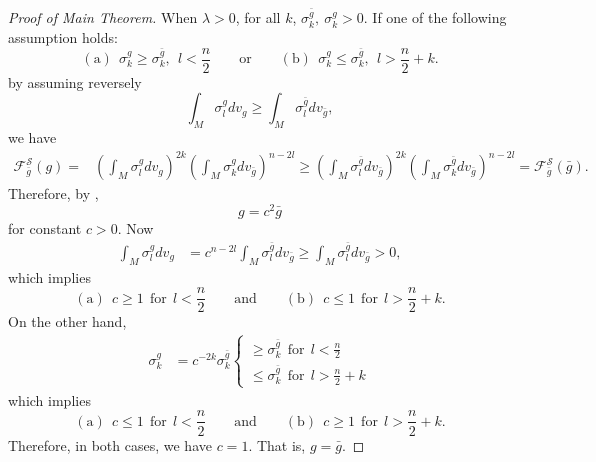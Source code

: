 \documentclass[12pt]{amsart}
\newcommand{\bg}{\bar{g}}
\numberwithin{equation}{section}
\begin{document}
\begin{proof}[Proof of Main Theorem]
    When $\lambda>0$, for all $k$, $\sigma_k^{\bg},\ \sigma_k^g>0$. If one of the following assumption holds:
    \begin{equation*}
        \mathrm{(a)}\ \ \sigma_k^g \geq \sigma_k^{\bg}, \ \ l< \frac{n}{2}\qquad\mathrm{or}\qquad\mathrm{(b)}\ \  \sigma_k^g \leq \sigma_k^{\bg}, \ \ l > \frac{n}{2} + k.
    \end{equation*}
    by assuming reversely
    \begin{equation*}
        \int_M\sigma_l^gdv_g\geq\int_M\sigma_l^{\bg}dv_{\bg},
    \end{equation*}
    we have
    \begin{align*}
        \mathcal{F}_{\bg}^{\mathcal{S}}(g)=&\left(\int_M\sigma_l^gdv_g\right)^{2k}\left(\int_M\sigma_k^gdv_{\bg}\right)^{n-2l} \geq \left( \int_M\sigma_l^{\bg}dv_{\bg} \right)^{2k} \left(\int_M\sigma_k^{\bg}dv_{\bg}\right)^{n-2l}=\mathcal{F}_{\bg}^{\mathcal{S}}(\bg).
    \end{align*}
    Therefore, by ,
    \begin{equation*}
        g=c^2\bg
    \end{equation*}
    for constant $c>0$. Now
    \begin{align*}
        \int_M\sigma_l^gdv_g &= c^{n-2l}\int_M\sigma_l^{\bg}dv_{\bg} \geq \int_M\sigma_l^{\bg}dv_{\bg}>0,
    \end{align*}
    which implies 
    \begin{equation*}
        \mathrm{(a)}\ \ c \geq 1 \ \ \mathrm{for} \ \ l< \frac{n}{2}\qquad\mathrm{and}\qquad\mathrm{(b)}\ \ c \leq 1 \ \ \mathrm{for} \ \ l > \frac{n}{2} + k.
    \end{equation*}
    On the other hand,
    \begin{align*}
        \sigma_k^g &= c^{-2k}\sigma_k^{\bg}\begin{cases}
            \geq\sigma_k^{\bg}\ \ \mathrm{for}\ \ l<\frac{n}{2}\\
            \leq\sigma_k^{\bg}\ \ \mathrm{for}\ \ l>\frac{n}{2}+k
        \end{cases}
    \end{align*}
    which implies
    \begin{equation*}
        \mathrm{(a)}\ \ c \leq 1 \ \ \mathrm{for} \ \ l< \frac{n}{2}\qquad\mathrm{and}\qquad\mathrm{(b)}\ \ c \geq 1 \ \ \mathrm{for} \ \ l > \frac{n}{2} + k.
    \end{equation*}
    Therefore, in both cases, we have $c=1$. That is, $g=\bg$.


\end{proof}
\end{document}
